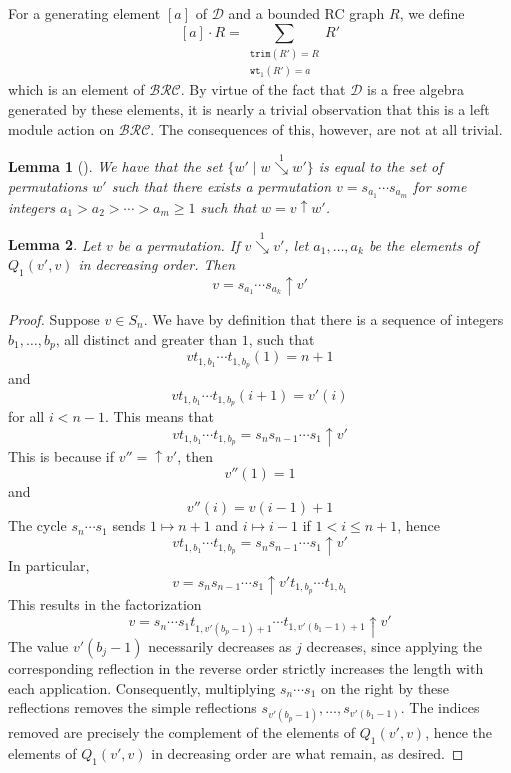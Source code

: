 \documentclass{amsart}
\newtheorem{lemma}{Lemma}[subsection]
\theoremstyle{definition}
\theoremstyle{remark}
\numberwithin{equation}{subsection}
\newcommand{\shup}{{\uparrow}}
\newcommand{\downvar}[1]{\stackrel{#1}{\searrow}}
\newcommand{\wtt}{\mathtt{wt}}
\newcommand{\trm}{\mathtt{trim}}
\newcommand{\BRC}{\mathcal{BRC}}
\newcommand{\dcoma}{\mathcal{D}}
\begin{document}
For a generating element $[a]$ of $\dcoma$ and a bounded RC graph $R$, we define 
$$[a]\cdot R=\sum_{\substack{\trm(R') = R\\\wtt_1(R') = a}}R'$$
which is an element of $\BRC$. By virtue of the fact that $\dcoma$ is a free algebra generated by these elements, it is nearly a trivial observation that this is a left module action on $\BRC$. The consequences of this, however, are not at all trivial.

\begin{lemma}[{\cite[Corollary~3.11]{bbrc}}] \label{lemma:d1desc}
We have that the set $\{w'\mid w\downvar{1} w'\}$ is equal to the set of permutations $w'$ such that there exists a permutation $v=s_{a_1}\cdots s_{a_m}$ for some integers $a_1>a_2>\cdots>a_m\geq 1$ such that $w =v\shup{w'}$.
\end{lemma}


\begin{lemma}\label{lemma:factor}
Let $v$ be a permutation. If $v\downvar{1} v'$, let $a_1,\ldots, a_k$ be the elements of $Q_1(v',v)$ in decreasing order. Then
$$v=s_{a_1}\cdots s_{a_k}\shup{v'}$$
\end{lemma}
\begin{proof}
	Suppose $v\in S_{n}$. We have by definition that there is a sequence of integers $b_1,\ldots,b_p$, all distinct and greater than $1$, such that
	$$vt_{1,b_1}\cdots t_{1, b_p}(1) = n + 1$$
	and
	$$vt_{1,b_1}\cdots t_{1, b_p}(i+1) = v'(i)$$
	for all $i<n-1$. This means that
	$$vt_{1,b_1}\cdots t_{1, b_p} = s_ns_{n-1}\cdots s_1\shup{v'}$$
	This is because if $v''=\shup{v'}$, then
	$$v''(1)=1$$
	and
	$$v''(i) = v(i-1)+1$$
	The cycle $s_n\cdots s_1$ sends $1\mapsto n+1$ and $i\mapsto i-1$ if $1<i\leq n+1$, hence
	$$vt_{1,b_1}\cdots t_{1, b_p} = s_ns_{n-1}\cdots s_1\shup{v'}$$
	In particular,
	$$v = s_ns_{n-1}\cdots s_1\shup{v'}t_{1,b_p}\cdots t_{1, b_1}$$
	This results in the factorization
	$$v = s_n\cdots s_1t_{1,v'(b_p-1)+1}\cdots t_{1,v'(b_1-1)+1}\shup{v'}$$
	The value $v'(b_j-1)$ necessarily decreases as $j$ decreases, since applying the corresponding reflection in the reverse order strictly increases the length with each application.  Consequently, multiplying $s_n\cdots s_1$ on the right by these reflections removes the simple reflections $s_{v'(b_p-1)},\ldots, s_{v'(b_1-1)}$. The indices removed are precisely the complement of the elements of $Q_1(v',v)$, hence the elements of $Q_1(v',v)$ in decreasing order are what remain, as desired.
\end{proof}
\end{document}
